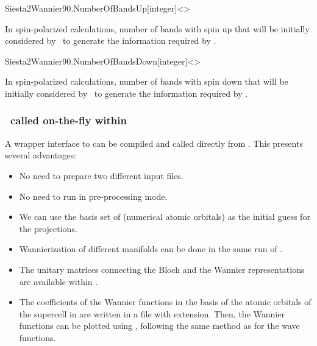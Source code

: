   \begin{fdfentry}{Siesta2Wannier90.NumberOfBandsUp}[integer]<>

    In spin-polarized calculations, number of bands with spin up that
    will be initially considered by \siesta\ to generate the information
    required by .

  \end{fdfentry}

  \begin{fdfentry}{Siesta2Wannier90.NumberOfBandsDown}[integer]<>

    In spin-polarized calculations, number of bands with spin down that
    will be initially considered by \siesta\ to generate the information
    required by .

  \end{fdfentry}


  \subsubsection{\, called on-the-fly within
      }
  \label{sec:w90:library}

   A wrapper interface to  can be compiled and called directly
   from . This presents several advantages:

   \begin{itemize}
     \item No need to prepare two different input files.
     \item No need to run  in pre-processing mode.
     \item We can use the basis set of  (numerical
           atomic orbitals) as the initial guess for the projections.
     \item Wannierization of different manifolds can be done in the
           same run of .
     \item The unitary matrices connecting the Bloch and the Wannier
           representations are available within .
     \item The coefficients of the Wannier functions in the
           basis of the atomic orbitals of the supercell in 
           are written in a file with  extension. Then,
           the Wannier functions can be plotted using
           , following the same method as for the wave functions.
   \end{itemize}

